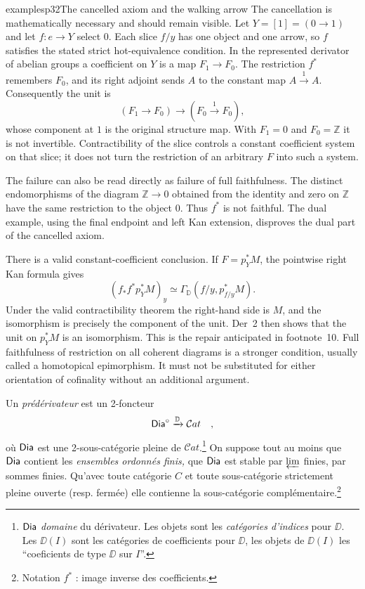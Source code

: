 \begin{dcomment}{examples}{p32}{The cancelled axiom and the walking arrow}
The cancellation is mathematically necessary and should remain visible.
Let $Y=[1]=(0\to1)$ and let $f:e\to Y$ select $0$. Each slice $f/y$
has one object and one arrow, so $f$ satisfies the stated strict
hot-equivalence condition. In the represented derivator of abelian
groups a coefficient on $Y$ is a map $F_1\to F_0$. The restriction
$f^*$ remembers $F_0$, and its right adjoint sends $A$ to the constant
map $A\xrightarrow{1}A$. Consequently the unit is
\[
 (F_1\longrightarrow F_0)\longrightarrow
 (F_0\xrightarrow{1}F_0),
\]
whose component at $1$ is the original structure map. With
$F_1=0$ and $F_0=\mathbb Z$ it is not invertible. Contractibility of
the slice controls a constant coefficient system on that slice; it
does not turn the restriction of an arbitrary $F$ into such a system.

The failure can also be read directly as failure of full faithfulness.
The distinct endomorphisms of the diagram
$\mathbb Z\to0$ obtained from the identity and zero on $\mathbb Z$
have the same restriction to the object $0$. Thus $f^*$ is not faithful.
The dual example, using the final endpoint and left Kan extension,
disproves the dual part of the cancelled axiom.

There is a valid constant-coefficient conclusion. If
$F=p_Y^*M$, the pointwise right Kan formula gives
\[
 (f_*f^*p_Y^*M)_y
 \simeq\Gamma_{\mathbb D}(f/y,p_{f/y}^*M).
\]
Under the valid contractibility theorem the right-hand side is $M$, and
the isomorphism is precisely the component of the unit. Der~2 then
shows that the unit on $p_Y^*M$ is an isomorphism. This is the repair
anticipated in footnote~10. Full faithfulness of restriction on all
coherent diagrams is a stronger condition, usually called a
homotopical epimorphism. It must not be substituted for either
orientation of cofinality without an additional argument.
\end{dcomment}


Un \textit{prédérivateur} est un 2-foncteur
\[ \mathsf{Dia}^\circ \xrightarrow{\mathbb{D}} \mathcal{C}at \quad , \]
où $\mathsf{Dia}$ est une 2-sous-catégorie pleine de $\mathcal{C}at$.\footnote[11]{$\mathsf{Dia}$ \textit{domaine} du dérivateur. Les objets sont les \textit{catégories d'indices} pour $\DD$. Les $\DD(I)$ sont les catégories de coefficients pour $\DD$, les objets de $\DD(I)$ les “coeficients de type $\DD$ sur $I$”. %
} On suppose tout au moins que $\mathsf{Dia}$ contient les \textit{ensembles ordonnés finis,} que $\mathsf{Dia}$ est stable par $\varprojlim$ finies, par sommes finies. Qu'avec toute catégorie $C$ et toute sous-catégorie strictement pleine ouverte (resp. fermée) elle contienne la sous-catégorie complémentaire.\footnote[12]{Notation $f^*$ : image inverse des coefficients.}

